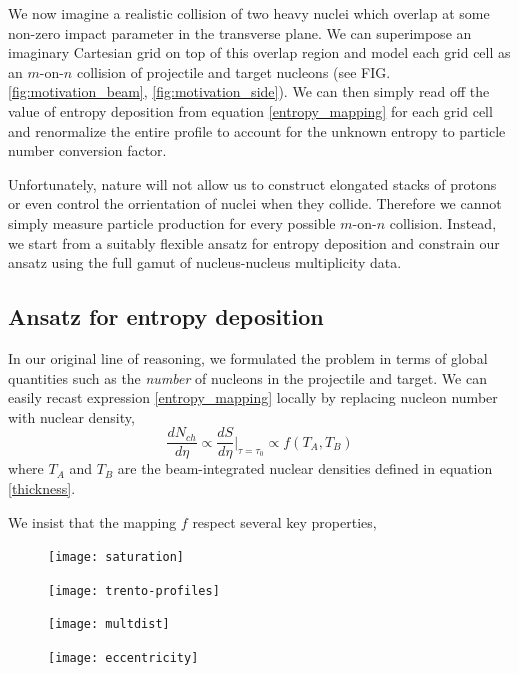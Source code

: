 \documentclass[aps,prc,reprint,amsmath,nofootinbib]{revtex4-1}
\begin{document}
We now imagine a realistic collision of two heavy nuclei which overlap at some non-zero impact parameter in the transverse plane. We can superimpose an imaginary
Cartesian grid on top of this overlap region and model each grid cell as an $m$-on-$n$ collision of projectile and target nucleons 
(see FIG. \ref{fig:motivation_beam}, \ref{fig:motivation_side}). We can then simply read off the value of entropy deposition from equation \ref{entropy_mapping} 
for each grid cell and renormalize the entire profile to account for the unknown entropy to particle number conversion factor.

Unfortunately, nature will not allow us to construct elongated stacks of protons or even control the orrientation of nuclei when they collide. Therefore we cannot simply
measure particle production for every possible $m$-on-$n$ collision. Instead, we start from a suitably flexible ansatz for entropy deposition and constrain our ansatz 
using the full gamut of nucleus-nucleus multiplicity data.

\subsection{Ansatz for entropy deposition}

In our original line of reasoning, we formulated the problem in terms of global quantities such as the \emph{number} of nucleons in the projectile and target.
We can easily recast expression \ref{entropy_mapping} locally by replacing nucleon number with nuclear density,
\begin{equation}
 \frac{dN_{ch}}{d\eta} \propto \frac{dS}{d\eta} \bigg|_{\tau=\tau_0} \propto f(T_A,T_B)
\end{equation}
where $T_A$ and $T_B$ are the beam-integrated nuclear densities defined in equation \ref{thickness}.

We insist that the mapping $f$ respect several key properties,

\begin{figure}
 \texttt{[image: saturation]}
\end{figure}

\begin{figure}
 \texttt{[image: trento-profiles]}
\end{figure}

\begin{figure}
 \texttt{[image: multdist]}
\end{figure}

\begin{figure}
 \texttt{[image: eccentricity]}
\end{figure}


\end{document}
